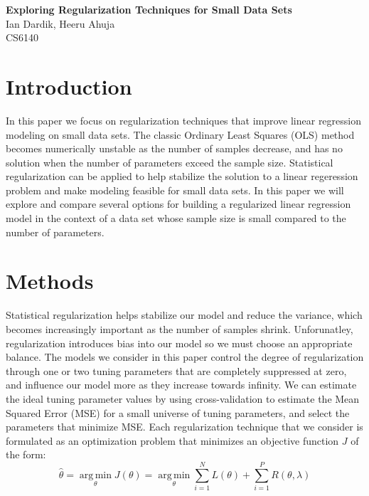 \documentclass[11pt]{article}
\newcommand{\thh}{\hat{\theta}}
\DeclareMathOperator*{\argmin}{arg\,min}
\begin{document}
\begin{center}
\textbf{Exploring Regularization Techniques for Small Data Sets} \\
Ian Dardik, Heeru Ahuja \\
CS6140 \\
\end{center}

\section{Introduction}
In this paper we focus on regularization techniques that improve linear regression modeling on small data sets.  The classic Ordinary Least Squares (OLS) method becomes numerically unstable as the number of samples decrease, and has no solution when the number of parameters exceed the sample size.  Statistical regularization can be applied to help stabilize the solution to a linear regeression problem and make modeling feasible for small data sets.  In this paper we will explore and compare several options for building a regularized linear regression model in the context of a data set whose sample size is small compared to the number of parameters.  

\section{Methods}
Statistical regularization helps stabilize our model and reduce the variance, which becomes increasingly important as the number of samples shrink.  Unforunatley, regularization introduces bias into our model so we must choose an appropriate balance.  The models we consider in this paper control the degree of regularization through one or two tuning parameters that are completely suppressed at zero, and influence our model more as they increase towards infinity.  We can estimate the ideal tuning parameter values by using cross-validation to estimate the Mean Squared Error (MSE) for a small universe of tuning parameters, and select the parameters that minimize MSE.  Each regularization technique that we consider is formulated as an optimization problem that minimizes an objective function $J$ of the form:
	$$\thh = \argmin\limits_\theta J(\theta) =\argmin\limits_\theta \sum\limits_{i=1}^N L(\theta) + \sum\limits_{i=1}^P R(\theta,\lambda)$$
\end{document}
